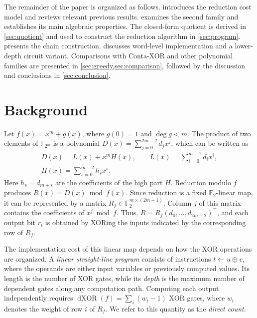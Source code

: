 \documentclass{ieeeaccess}
\theoremstyle{plain}
\theoremstyle{definition}
\newcommand{\F}{\mathbb{F}}
\newcommand{\Ftm}{\F_{2^m}}
\newcommand{\dX}{\operatorname{dXOR}}
\newcommand{\xor}{\oplus}
\begin{document}
The remainder of the paper is organized as follows. 
introduces the reduction cost model and reviews relevant previous results.
 examines the second family and establishes its main algebraic
properties. The closed-form quotient is derived in \cref{sec:quotient} and used
to construct the reduction algorithm in \cref{sec:program}. 
presents the chain construction. 
discusses word-level implementation and a lower-depth circuit variant.
Comparisons with Conta-XOR and other polynomial families are presented in
\cref{sec:greedy,sec:comparison}, followed by the discussion and conclusions in
\cref{sec:conclusion}.

\section{Background}\label{sec:background}

Let $f(x)=x^m+g(x)$, where $g(0)=1$ and $\deg g<m$. The product of two elements of
$\Ftm$ is a polynomial $D(x)=\sum_{j=0}^{2m-2}d_jx^j$, which can be written as
\begin{equation}\label{eq:split}
\begin{gathered}
  D(x)=L(x)+x^mH(x),\qquad L(x)=\sum_{i=0}^{m-1}d_ix^i,\\
  H(x)=\sum_{s=0}^{m-2}h_sx^s.
\end{gathered}
\end{equation}
Here $h_s=d_{m+s}$ are the coefficients of the high part $H$. Reduction modulo $f$
produces $R(x)=D(x)\bmod f(x)$. Since reduction is a fixed
$\F_2$-linear map, it can be represented by a matrix
$R_f\in\F_2^{m\times(2m-1)}$. Column $j$ of this matrix contains the
coefficients of $x^j\bmod f$. Thus, $R=R_f(d_0,\dots,d_{2m-2})^{\top}$, and each
output bit $r_i$ is obtained by XORing the inputs indicated by the corresponding
row of $R_f$.

The implementation cost of this linear map depends on how the XOR operations are
organized. A \emph{linear straight-line program} consists of instructions
$t\gets u\xor v$, where the operands are either input variables or previously
computed values. Its length is the number of XOR gates, while its \emph{depth}
is the maximum number of dependent gates along any computation path. Computing
each output independently requires $\dX(f)=\sum_i(w_i-1)$ XOR gates, where $w_i$
denotes the weight of row $i$ of $R_f$. We refer to this quantity as the
\emph{direct count}.
\end{document}
